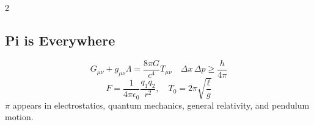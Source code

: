 \documentclass[10pt,a4paper]{article}
\begin{document}
\begin{multicols}{2}
\subsection{Pi is Everywhere}
\[
G_{\mu\nu} + g_{\mu\nu}\Lambda = \frac{8\pi G}{c^4} T_{\mu\nu} \quad \Delta x\,\Delta p \geq \frac{h}{4\pi}
\]
\[
F = \frac{1}{4\pi\epsilon_0}\frac{q_1 q_2}{r^2}, \quad T_0 = 2\pi\sqrt{\frac{\ell}{g}}
\]
$\pi$ appears in electrostatics, quantum mechanics, general relativity, and pendulum motion.

\end{multicols}
\end{document}
